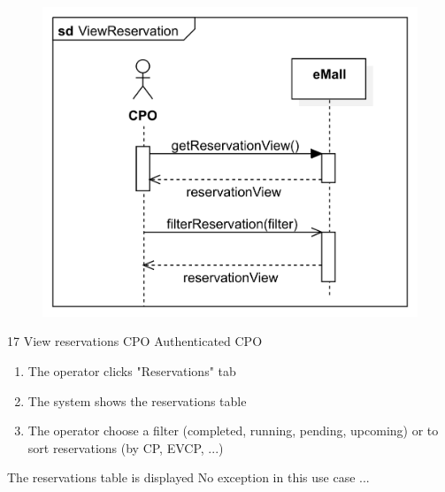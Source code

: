 \usecase
{
    \begin{figure}[H]
        \centering
        \includegraphics[scale=0.9]{src/sequence_diagram/ViewReservation.png}
    \end{figure}
}
{17}
{View reservations} %
{CPO} %
{Authenticated CPO} %
{ %
    \begin{enumerate}

        \item The operator clicks "Reservations" tab
        \item The system shows the reservations table
        \item The operator choose a filter (completed, running, pending, upcoming) or to sort reservations (by CP, EVCP, ...)
    \end{enumerate}
}
{The reservations table is displayed} %
{ %
    No exception in this use case
}
{ %
    ...
}

